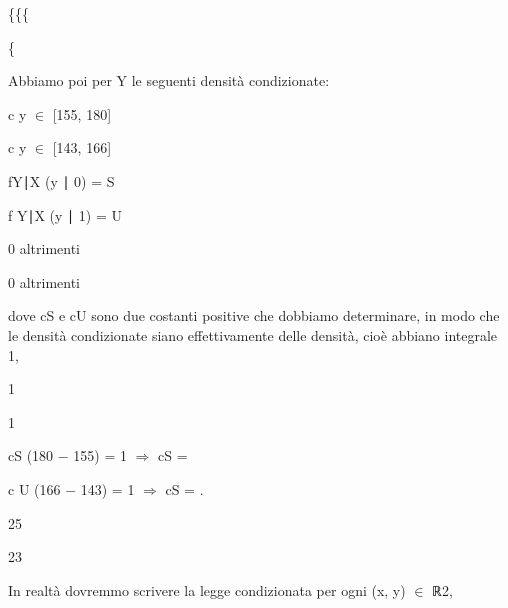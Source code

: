 \documentclass[a4paper,portrait,12pt]{article}
\begin{document}
\{\{\{


\{





\begin{flushleft}
Abbiamo poi per Y le seguenti densit\`{a} condizionate:
\end{flushleft}


\begin{flushleft}
c y $\in$ [155, 180]
\end{flushleft}


\begin{flushleft}
c y $\in$ [143, 166]
\end{flushleft}


\begin{flushleft}
fY∣X (y ∣ 0) = S
\end{flushleft}


\begin{flushleft}
f Y∣X (y ∣ 1) = U
\end{flushleft}


\begin{flushleft}
0 altrimenti
\end{flushleft}


\begin{flushleft}
0 altrimenti
\end{flushleft}


\begin{flushleft}
dove cS e cU sono due costanti positive che dobbiamo determinare, in modo che le densit\`{a} condizionate siano effettivamente delle densit\`{a}, cio\`{e} abbiano integrale 1,
\end{flushleft}


1


1


\begin{flushleft}
cS (180 $-$ 155) = 1 $\Rightarrow$ cS =
\end{flushleft}


\begin{flushleft}
c U (166 $-$ 143) = 1 $\Rightarrow$ cS = .
\end{flushleft}


25


23


\begin{flushleft}
In realt\`{a} dovremmo scrivere la legge condizionata per ogni (x, y) $\in$ ℝ2,
\end{flushleft}
\end{document}
